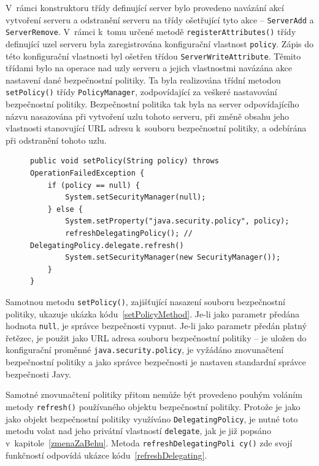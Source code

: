 V~rámci konstruktoru třídy definující server bylo provedeno navázání akcí vytvoření serveru a odstranění serveru na třídy ošetřující tyto akce -- {\tt ServerAdd} a {\tt ServerRemove}.
V~rámci k~tomu určené metodě {\tt registerAttributes()} třídy definující uzel serveru byla zaregistrována konfigurační vlastnost {\tt policy}.
Zápis do této konfigurační vlastnosti byl ošetřen třídou {\tt ServerWriteAttribute}.
Těmito třídami bylo na operace nad uzly serveru a jejich vlastnostmi navázána akce nastavení dané bezpečnostní politiky.
Ta byla realizována třídní metodou {\tt setPolicy()} třídy {\tt PolicyManager}, zodpovídající za veškeré nastavování bezpečnostní politiky.
Bezpečnostní politika tak byla na server odpovídajícího názvu nasazována při vytvoření uzlu tohoto serveru, při změně obsahu jeho vlastnosti stanovující URL adresu k~souboru bezpečnostní politiky, a odebírána při odstranění tohoto uzlu.

\begin{figure}[t]
\begin{lstlisting}[caption=Metoda {\tt PolicyManager.setPolicy()} zajišťující nasazení souboru bezpečnostní politiky, label=setPolicyMethod]
public void setPolicy(String policy) throws OperationFailedException {
    if (policy == null) {
        System.setSecurityManager(null);
    } else {
        System.setProperty("java.security.policy", policy);
        refreshDelegatingPolicy(); // DelegatingPolicy.delegate.refresh()
        System.setSecurityManager(new SecurityManager());
    }
}
\end{lstlisting}
\end{figure}

Samotnou metodu {\tt setPolicy()}, zajišťující nasazení souboru bezpečnostní politiky, ukazuje ukázka kódu~\ref{setPolicyMethod}.
Je-li jako parametr předána hodnota  {\tt null}, je správce bezpečnosti vypnut.
Je-li jako parametr předán platný řetězec, je použit jako URL adresa souboru bezpečnostní politiky -- je uložen do konfigurační proměnné {\tt java.security.policy}, je vyžádáno znovunačtení bezpečnostní politiky a jako správce bezpečnosti je nastaven standardní správce bezpečnosti Javy.

Samotné znovunačtení politiky přitom nemůže být provedeno pouhým voláním metody {\tt refresh()} používaného objektu bezpečnostní politiky.
Protože je jako jako objekt bezpečnostní politiky využíváno {\tt DelegatingPolicy}, je nutné toto metodu volat nad jeho privátní vlastností {\tt delegate},
jak je již popsáno v~kapitole~\ref{zmenaZaBehu}. Metoda {\tt refreshDelegatingPoli cy()} zde svojí funkčností odpovídá ukázce kódu~\ref{refreshDelegating}.

